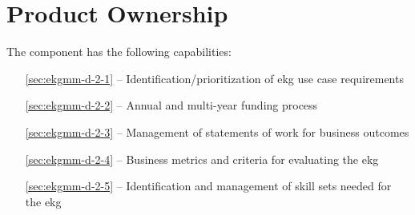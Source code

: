\chapter{Product Ownership}\label{ch:ekgmm-d-2}

The  component has the following capabilities:

\begin{itemize}[leftmargin=.5in]
  \item [\ref{sec:ekgmm-d-2-1}]  -- Identification/prioritization of \gls{ekg} use case requirements
  \item [\ref{sec:ekgmm-d-2-2}]  -- Annual and multi-year funding process
  \item [\ref{sec:ekgmm-d-2-3}]  -- Management of statements of work for business outcomes
  \item [\ref{sec:ekgmm-d-2-4}]  -- Business metrics and criteria for evaluating the \gls{ekg}
  \item [\ref{sec:ekgmm-d-2-5}]  -- Identification and management of skill sets needed for the \gls{ekg}
\end{itemize}






